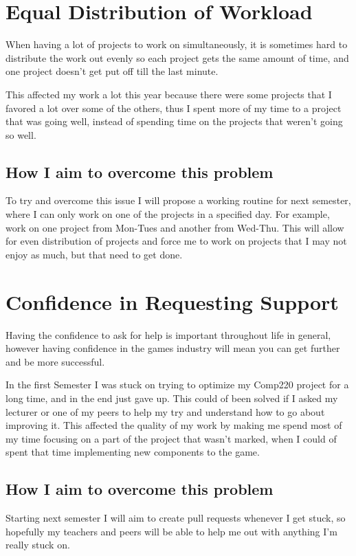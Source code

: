 \documentclass{scrartcl}
\begin{document}
\section{Equal Distribution of Workload}
When having a lot of projects to work on simultaneously, it is sometimes hard to distribute the work out evenly so each project gets the same amount of time, and one project doesn't get put off till the last minute. 

This affected my work a lot this year because there were some projects that I favored a lot over some of the others, thus I spent more of my time to a project that was going well, instead of spending time on the projects that weren't going so well.

\subsection{How I aim to overcome this problem}
To try and overcome this issue I will propose a working routine for next semester, where I can only work on one of the projects in a specified day. For example, work on one project from Mon-Tues and another from Wed-Thu. This will allow for even distribution of projects and force me to work on projects that I may not enjoy as much, but that need to get done.


\section{Confidence in Requesting Support}
Having the confidence to ask for help is important throughout life in general, however having confidence in the games industry will mean you can get further and be more successful.


In the first Semester I was stuck on trying to optimize my Comp220 project for a long time, and in the end just gave up. This could of been solved if I asked my lecturer or one of my peers to help my try and understand how to go about improving it.
This affected the quality of my work by making me spend most of my time focusing on a part of the project that wasn't marked, when I could of spent that time implementing new components to the game.


\subsection{How I aim to overcome this problem}
Starting next semester I will aim to create pull requests whenever I get stuck, so hopefully my teachers and peers will be able to help me out with anything I'm really stuck on.
\end{document}

